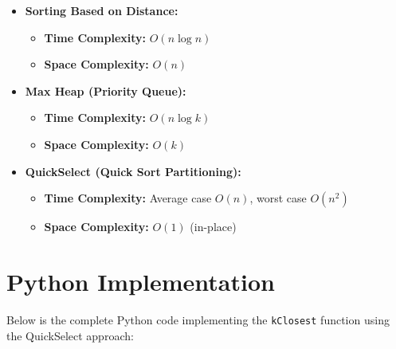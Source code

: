 \begin{itemize}
    \item \textbf{Sorting Based on Distance:}
    \begin{itemize}
        \item \textbf{Time Complexity:} \(O(n \log n)\)
        \item \textbf{Space Complexity:} \(O(n)\)
    \end{itemize}
    
    \item \textbf{Max Heap (Priority Queue):}
    \begin{itemize}
        \item \textbf{Time Complexity:} \(O(n \log k)\)
        \item \textbf{Space Complexity:} \(O(k)\)
    \end{itemize}
    
    \item \textbf{QuickSelect (Quick Sort Partitioning):}
    \begin{itemize}
        \item \textbf{Time Complexity:} Average case \(O(n)\), worst case \(O(n^2)\)
        \item \textbf{Space Complexity:} \(O(1)\) (in-place)
    \end{itemize}
\end{itemize}

\section*{Python Implementation}


Below is the complete Python code implementing the \texttt{kClosest} function using the QuickSelect approach:

